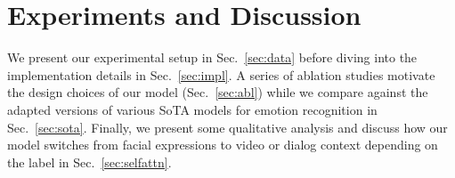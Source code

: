 \chapter{Experiments and Discussion}
\label{ch:exp}

We present our experimental setup in Sec.~\ref{sec:data} before diving into the implementation details in Sec.~\ref{sec:impl}.
A series of ablation studies motivate the design choices of our model (Sec.~\ref{sec:abl}) while we compare against the adapted versions of various SoTA models for emotion recognition in Sec.~\ref{sec:sota}.
Finally, we present some qualitative analysis and discuss how our model switches from facial expressions to video or dialog context depending on the label in Sec.~\ref{sec:selfattn}.
